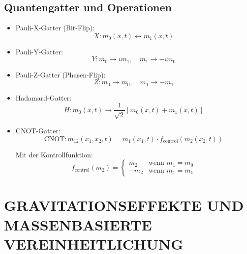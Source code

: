 \documentclass[12pt,a4paper]{article}
\begin{document}
	\subsection{Quantengatter und Operationen}
	\begin{itemize}
		\item Pauli-X-Gatter (Bit-Flip):
		\begin{equation}
			X: m_0(x,t) \leftrightarrow m_1(x,t)
		\end{equation}
		
		\item Pauli-Y-Gatter:
		\begin{equation}
			Y: m_0 \rightarrow im_1, \quad m_1 \rightarrow -im_0
		\end{equation}
		
		\item Pauli-Z-Gatter (Phasen-Flip):
		\begin{equation}
			Z: m_0 \rightarrow m_0, \quad m_1 \rightarrow -m_1
		\end{equation}
		
		\item Hadamard-Gatter:
		\begin{equation}
			H: m_0(x,t) \rightarrow \frac{1}{\sqrt{2}}[m_0(x,t) + m_1(x,t)]
		\end{equation}
		
		\item CNOT-Gatter:
		\begin{equation}
			\text{CNOT}: m_{12}(x_1,x_2,t) = m_1(x_1,t) \cdot f_{\text{control}}(m_2(x_2,t))
		\end{equation}
		
		Mit der Kontrollfunktion:
		\begin{equation}
			f_{\text{control}}(m_2) = 
			\begin{cases}
				m_2 & \text{wenn } m_1 = m_0 \\
				-m_2 & \text{wenn } m_1 = m_1
			\end{cases}
		\end{equation}
	\end{itemize}

\section{GRAVITATIONSEFFEKTE UND MASSENBASIERTE VEREINHEITLICHUNG}
\end{document}
